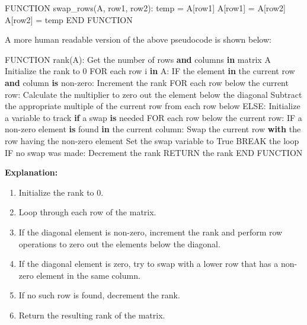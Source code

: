 \documentclass[
  letterpaper,
  DIV=11,
  numbers=noendperiod]{scrreprt}
\newenvironment{Shaded}{\begin{snugshade}}{\end{snugshade}}
\newcommand{\ControlFlowTok}[1]{\textcolor[rgb]{0.00,0.23,0.31}{\textbf{#1}}}
\newcommand{\DecValTok}[1]{\textcolor[rgb]{0.68,0.00,0.00}{#1}}
\newcommand{\ImportTok}[1]{\textcolor[rgb]{0.00,0.46,0.62}{#1}}
\newcommand{\KeywordTok}[1]{\textcolor[rgb]{0.00,0.23,0.31}{\textbf{#1}}}
\newcommand{\NormalTok}[1]{\textcolor[rgb]{0.00,0.23,0.31}{#1}}
\newcommand{\OperatorTok}[1]{\textcolor[rgb]{0.37,0.37,0.37}{#1}}
\newcommand{\VariableTok}[1]{\textcolor[rgb]{0.07,0.07,0.07}{#1}}
\providecommand{\tightlist}{%
  \setlength{\itemsep}{0pt}\setlength{\parskip}{0pt}}\usepackage{longtable,booktabs,array}
\theoremstyle{plain}
\theoremstyle{definition}
\theoremstyle{remark}
\begin{document}
\begin{Shaded}
\begin{Highlighting}[]
\NormalTok{FUNCTION swap\_rows(A, row1, row2):}
\NormalTok{    temp }\OperatorTok{=}\NormalTok{ A[row1]}
\NormalTok{    A[row1] }\OperatorTok{=}\NormalTok{ A[row2]}
\NormalTok{    A[row2] }\OperatorTok{=}\NormalTok{ temp}
\NormalTok{END FUNCTION}
\end{Highlighting}
\end{Shaded}

A more human readable version of the above pseudocode is shown below:

\begin{Shaded}
\begin{Highlighting}[]
\NormalTok{FUNCTION rank(A):}
\NormalTok{    Get the number of rows }\KeywordTok{and}\NormalTok{ columns }\KeywordTok{in}\NormalTok{ matrix A}
\NormalTok{    Initialize the rank to }\DecValTok{0}
\NormalTok{    FOR each row i }\KeywordTok{in}\NormalTok{ A:}
\NormalTok{        IF the element }\KeywordTok{in}\NormalTok{ the current row }\KeywordTok{and}\NormalTok{ column }\KeywordTok{is}\NormalTok{ non}\OperatorTok{{-}}\NormalTok{zero:}
\NormalTok{            Increment the rank}
\NormalTok{            FOR each row below the current row:}
\NormalTok{                Calculate the multiplier to zero out the element below the diagonal}
\NormalTok{                Subtract the appropriate multiple of the current row }\ImportTok{from}\NormalTok{ each row below}
\NormalTok{        ELSE:}
\NormalTok{            Initialize a variable to track }\ControlFlowTok{if}\NormalTok{ a swap }\KeywordTok{is}\NormalTok{ needed}
\NormalTok{            FOR each row below the current row:}
\NormalTok{                IF a non}\OperatorTok{{-}}\NormalTok{zero element }\KeywordTok{is}\NormalTok{ found }\KeywordTok{in}\NormalTok{ the current column:}
\NormalTok{                    Swap the current row }\ControlFlowTok{with}\NormalTok{ the row having the non}\OperatorTok{{-}}\NormalTok{zero element}
\NormalTok{                    Set the swap variable to }\VariableTok{True}
\NormalTok{                    BREAK the loop}
\NormalTok{            IF no swap was made:}
\NormalTok{                Decrement the rank}
\NormalTok{    RETURN the rank}
\NormalTok{END FUNCTION}
\end{Highlighting}
\end{Shaded}

\textbf{Explanation:}

\begin{enumerate}
\def\labelenumi{\arabic{enumi}.}
\tightlist
\item
  Initialize the rank to 0.
\item
  Loop through each row of the matrix.
\item
  If the diagonal element is non-zero, increment the rank and perform
  row operations to zero out the elements below the diagonal.
\item
  If the diagonal element is zero, try to swap with a lower row that has
  a non-zero element in the same column.
\item
  If no such row is found, decrement the rank.
\item
  Return the resulting rank of the matrix.
\end{enumerate}
\end{document}

